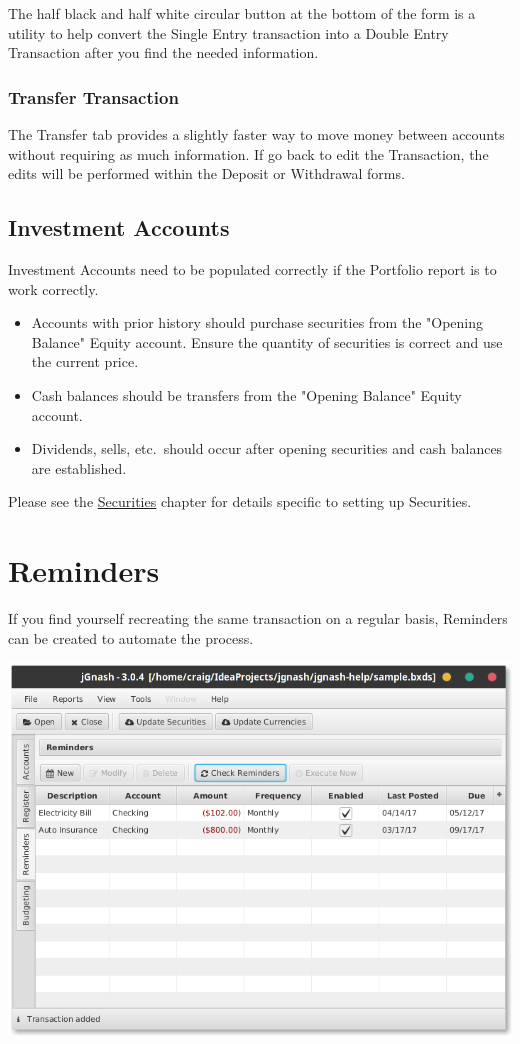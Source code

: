 \documentclass[letterpaper,12pt]{book}
\begin{document}
    The half black and half white circular button at the bottom of the form is a utility to help convert the
    Single Entry transaction into a Double Entry Transaction after you find the needed information.

    \subsection{Transfer Transaction}
    The Transfer tab provides a slightly faster way to move money between accounts without requiring as much information.
    If go back to edit the Transaction, the edits will be performed within the Deposit or Withdrawal forms.
    
    \section{Investment Accounts}
    Investment Accounts need to be populated correctly if the Portfolio report is to work correctly.

    \begin{itemize}
        \item Accounts with prior history should purchase securities from the "Opening Balance" Equity account. Ensure the quantity of
        securities is correct and use the current price.
        \item Cash balances should be transfers from the "Opening Balance" Equity account.
        \item Dividends, sells, etc.\ should occur after opening securities and cash balances are established.
    \end{itemize}

    Please see the \hyperref[ch:securities]{Securities} chapter for details specific to setting up Securities.

    \chapter{Reminders}
    If you find yourself recreating the same transaction on a regular basis, Reminders can be created to automate the process.

    \includegraphics[width=0.8\linewidth]{images/reminders}
\end{document}
